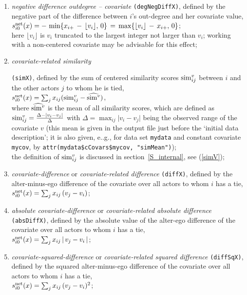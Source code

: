 \documentclass[a4paper,fleqn,11pt]{article}
\newcommand{\+}{\, + \,}
\newcommand{\vit}{\theenumi}
\begin{document}
\begin{enumerate}
 \item {\em negative difference outdegree -- covariate}
 \texttt{(degNegDiffX)},
 defined by the negative part of the difference between $i$'s out-degree
 and her covariate value,\\
 $s^{\rm net}_{i\vit}(x) =  - \, \min \{ x_{i+} \,-\, \lfloor v_i \rfloor  ,\, 0 \}
 \,=\, \max \{ \lfloor v_i \rfloor \,-\, x_{i+} ,\, 0 \}  $;\\
 here $\lfloor v_i \rfloor $ is $v_i$ truncated to the largest integer
 not larger than $v_i$;
 working with a non-centered covariate may be advisable for this effect;

 \item \hypertarget{T_simx}{{\em covariate-related similarity}} \texttt{(simX)},
 \label{simx}
 defined by the sum of centered similarity scores ${\rm sim}^v_{ij}$
 between $i$  and the other actors $j$ to whom he is tied,\\
 $s^{\rm net}_{i\vit}(x) = \sum_j x_{ij} ({\rm sim}^v_{ij} - \widehat{{\rm sim}^v}) $,\\
 where $\widehat{{\rm sim}^v}$ is the mean of all similarity scores, which are defined as
 ${\rm sim}^v_{ij}=\frac{\Delta-\vert v_i - v_j \vert}{\Delta}$ with
 $\Delta=\max_{ij}\vert v_i - v_j \vert$ being the observed range of the covariate $v$
 (this mean is given in the output file just before the
 `initial data description'; it is also given, e..g., for data set \texttt{mydata}
 and constant covariate \texttt{mycov}, by
 \texttt{attr(mydata\$cCovars\$mycov, "simMean")});\\
 the definition of ${\rm sim}^v_{ij}$ is discussed in
 section~\ref{S_internal}, see (\ref{simV});

 \item {\em covariate-difference} or {\em covariate-related difference}
 \texttt{(diffX)},
 defined by the alter-minus-ego difference of the covariate over all actors
 to whom $i$ has a tie,\\
 $s^{\rm net}_{i\vit}(x) = \sum_j x_{ij}\, (v_j - v_i)$;

 \item {\em absolute covariate-difference} or {\em covariate-related absolute difference}
 \texttt{(absDiffX)},
 defined by the absolute value of the alter-ego difference of the covariate over all actors
 to whom $i$ has a tie,\\
 $s^{\rm net}_{i\vit}(x) = \sum_j x_{ij}\, |\,v_j - v_i\,|$;

 \item {\em covariate-squared-difference} or {\em covariate-related squared difference}
 \texttt{(diffSqX)},
 defined by the squared alter-minus-ego difference of the covariate over all actors
 to whom $i$ has a tie,\\
 $s^{\rm net}_{i\vit}(x) = \sum_j x_{ij}\, (v_j - v_i)^2$;


\end{enumerate}
\end{document}
